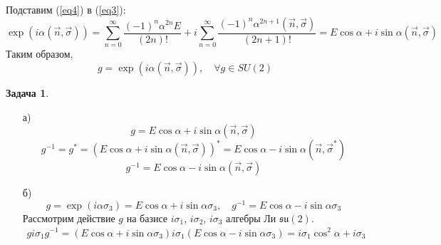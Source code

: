 \documentclass[12pt]{article}
\theoremstyle{definition}
\newtheorem{zad}{Задача}[section]
\begin{document}
Подставим (\ref{eq4}) в (\ref{eq3}):
\begin{equation}
    \exp(i\alpha(\vec{n},\vec{\sigma}))=\sum\limits_{n=0}^\infty\frac{(-1)^n\alpha^{2n}E}{(2n)!}+i\sum\limits_{n=0}^\infty\frac{(-1)^n\alpha^{2n+1}(\vec{n},\vec{\sigma})}{(2n+1)!}=E\cos\alpha+i\sin\alpha(\vec{n},\vec{\sigma})
\end{equation}
Таким образом,
\begin{equation}
    \boxed{g=\exp(i\alpha(\vec{n},\vec{\sigma})),\quad \forall g\in SU(2)}
\end{equation}
\begin{zad}
\begin{itemize}
    \item[а)]
    \begin{equation}
        g=E\cos\alpha+i\sin\alpha(\vec{n},\vec{\sigma})
    \end{equation}
    \begin{equation}
        g^{-1}=g^*=(E\cos\alpha+i\sin\alpha(\vec{n},\vec{\sigma}))^*=E\cos\alpha-i\sin\alpha(\vec{n},\vec{\sigma}^*)
    \end{equation}
    \begin{equation}
        \boxed{g^{-1}=E\cos\alpha-i\sin\alpha(\vec{n},\vec{\sigma})}
    \end{equation}
    \item[б)] 
    \begin{equation}
        g=\exp(i\alpha\sigma_3)=E\cos\alpha+i\sin\alpha\sigma_3,\quad g^{-1}=E\cos\alpha-i\sin\alpha\sigma_3
    \end{equation}
    Рассмотрим действие $g$ на базисе $i\sigma_1$, $i\sigma_2$, $i\sigma_3$ алгебры Ли $\mathfrak{su}(2)$.
    \begin{multline*}
        gi\sigma_1g^{-1}=(E\cos\alpha+i\sin\alpha\sigma_3)i\sigma_1(E\cos\alpha-i\sin\alpha\sigma_3)=i\sigma_1\cos^2\alpha+i\sigma_3

\end{multline*}
\end{itemize}
\end{zad}
\end{document}
